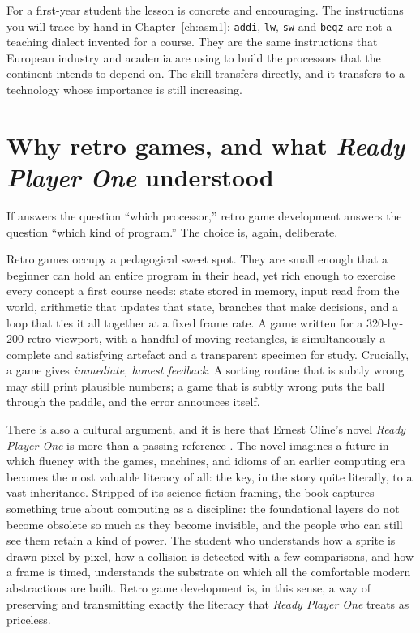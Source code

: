 For a first-year student the lesson is concrete and encouraging. The instructions
you will trace by hand in Chapter~\ref{ch:asm1}: \texttt{addi}, \texttt{lw},
\texttt{sw} and \texttt{beqz} are not a teaching dialect invented for a course.
They are the same instructions that European industry and academia are using to
build the processors that the continent intends to depend on. The skill transfers
directly, and it transfers to a technology whose importance is still increasing.

\section{Why retro games, and what \emph{Ready Player One} understood}

If \riscv answers the question ``which processor,'' retro game development
answers the question ``which kind of program.'' The choice is, again, deliberate.

Retro games occupy a pedagogical sweet spot. They are small enough that a
beginner can hold an entire program in their head, yet rich enough to exercise
every concept a first course needs: state stored in memory, input read from the
world, arithmetic that updates that state, branches that make decisions, and a
loop that ties it all together at a fixed frame rate. A game written for a
320-by-200 retro viewport, with a handful of moving rectangles, is simultaneously
a complete and satisfying artefact and a transparent specimen for study. Crucially,
a game gives \emph{immediate, honest feedback}. A sorting routine that is subtly
wrong may still print plausible numbers; a game that is subtly wrong puts the ball
through the paddle, and the error announces itself.

There is also a cultural argument, and it is here that Ernest Cline's novel
\emph{Ready Player One} is more than a passing reference \citep{cline2011}. The
novel imagines a future in which fluency with the games, machines, and idioms of
an earlier computing era becomes the most valuable literacy of all: the key, in
the story quite literally, to a vast inheritance. Stripped of its science-fiction
framing, the book captures something true about computing as a discipline: the
foundational layers do not become obsolete so much as they become invisible, and
the people who can still see them retain a kind of power. The student who
understands how a sprite is drawn pixel by pixel, how a collision is detected with
a few comparisons, and how a frame is timed, understands the substrate on which
all the comfortable modern abstractions are built. Retro game development is, in
this sense, a way of preserving and transmitting exactly the literacy that
\emph{Ready Player One} treats as priceless.

